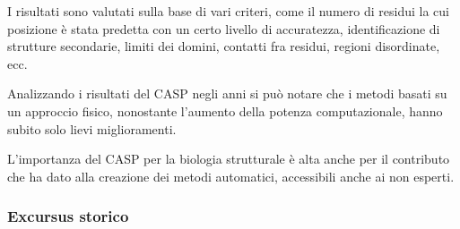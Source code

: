 \par I risultati sono valutati sulla base di vari criteri, come il numero di residui la cui posizione è stata predetta con un certo livello di accuratezza, identificazione di strutture secondarie, limiti dei domini, contatti fra residui, regioni disordinate, ecc.

\par Analizzando i risultati del CASP negli anni si può notare che i metodi basati su un approccio fisico, nonostante l'aumento della potenza computazionale, hanno subito solo lievi miglioramenti.

\par L'importanza del CASP per la biologia strutturale è alta anche per il contributo che ha dato alla creazione dei metodi automatici, accessibili anche ai non esperti.


\subsubsection{Excursus storico}

